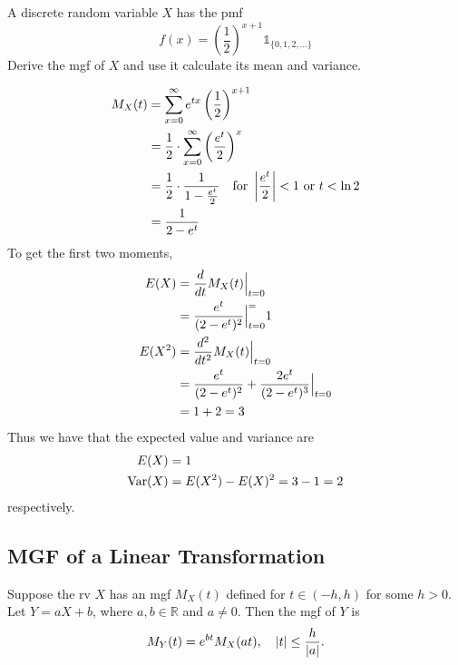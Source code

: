 \documentclass[notoc,notitlepage]{tufte-book}
\begin{document}
\begin{eg}[Example 2.27]
  A discrete random variable $X$ has the pmf
  \begin{equation*}
    f(x) = \left( \frac{1}{2} \right)^{x + 1} \mathbb{1}_{\{0, 1, 2, ...\}}
  \end{equation*}
  Derive the mgf of $X$ and use it calculate its mean and variance.

  \begin{align*}
    M_X(t) &= \sum_{x = 0}^{\infty} e^{tx} \left( \frac{1}{2} \right)^{x + 1} \\
           &= \frac{1}{2} \cdot \sum_{x = 0}^{\infty} \left( \frac{e^t}{2} \right)^x \\
           &= \frac{1}{2} \cdot \frac{1}{1 - \frac{e^t}{2}} \quad \text{for } \left|\frac{e^t}{2}\right| < 1 \text{ or } t < \ln 2 \\
           &= \frac{1}{2 - e^t}
  \end{align*}
  To get the first two moments,
  \begin{align*}
    E(X) &= \frac{d}{dt} M_X(t) \Big|_{t = 0}^{} \\
      &= \frac{e^t}{( 2 - e^t )^2} \Big|_{t = 0}^{=} 1 \\
    E(X^2) &= \frac{d^2}{dt^2} M_X(t) \Big|_{t = 0}^{} \\
      &= \frac{e^t}{(2 - e^t)^2} + \frac{2e^t}{(2 - e^t)^3} \Big|_{t = 0}^{} \\
      &= 1 + 2 = 3
  \end{align*}
  Thus we have that the expected value and variance are
  \begin{align*}
    E(X) &= 1 \\
    \operatorname{Var}(X) &= E(X^2) - E(X)^2 = 3 - 1 = 2
  \end{align*}
  respectively.
\end{eg}

\subsection{MGF of a Linear Transformation}
\label{sub:mgf_of_a_linear_transformation}

\begin{thm}
\label{thm:mgf_of_a_linear_transformation}
  Suppose the rv $X$ has an mgf $M_X(t)$ defined for $t \in (-h, h)$ for some $h > 0$. Let $Y = aX + b$, where $a, b \in \mathbb{R}$ and $a \neq 0$. Then the mgf of $Y$ is
  \begin{equation}\label{eq:mgf_of_a_linear_transformation}
    M_Y(t) = e^{bt} M_X(at), \quad \left|t\right| \leq \frac{h}{\left|a\right|}.
  \end{equation}
\end{thm}
\end{document}

